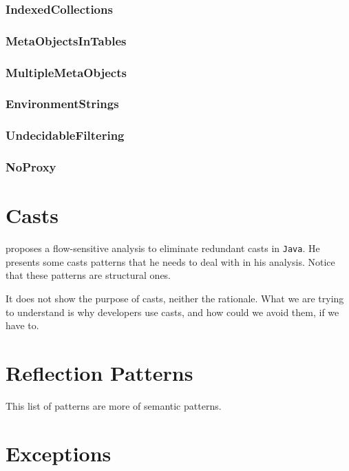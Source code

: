 \documentclass{usiinfdocprop}
\begin{document}
\subsection{IndexedCollections}
\label{sec:orgdacd184}
\subsection{MetaObjectsInTables}
\label{sec:orgddd614b}
\subsection{MultipleMetaObjects}
\label{sec:org8166883}
\subsection{EnvironmentStrings}
\label{sec:org09ca357}
\subsection{UndecidableFiltering}
\label{sec:org5488d52}
\subsection{NoProxy}
\label{sec:org8184e2a}

\chapter{Casts \label{orgaef2673}}
\label{sec:org4e84fd7}

\cite{winther_guarded_2011} proposes a flow-sensitive analysis to eliminate
redundant casts in \texttt{Java}.
He presents some casts patterns that he needs to deal with in his analysis.
Notice that these patterns are structural ones.

\cite{staicu_understanding_2017}

\cite{buse_synthesizing_2012}

It does not show the purpose of casts, neither the rationale.
What we are trying to understand is why developers use casts,
and how could we avoid them, if we have to.

\chapter{Reflection Patterns \label{orgf7d189c}}
\label{sec:orgdef996c}

This list of patterns are more of semantic patterns.

\chapter{Exceptions \label{org601f15a}}
\label{sec:org20c3dba}
\end{document}
